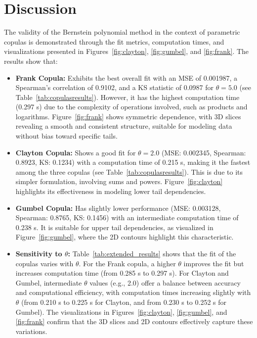 \documentclass[
	11pt, %
	fleqn, %
	a4paper, %
]{LegrandOrangeBook}
\begin{document}
\section{Discussion}
The validity of the Bernstein polynomial method in the context of parametric copulas is demonstrated through the fit metrics, computation times, and visualizations presented in Figures~\ref{fig:clayton}, \ref{fig:gumbel}, and \ref{fig:frank}. The results show that:

\begin{itemize}
\item \textbf{Frank Copula:} Exhibits the best overall fit with an MSE of 0.001987, a Spearman's correlation of 0.9102, and a KS statistic of 0.0987 for $\theta=5.0$ (see Table~\ref{tab:copulasresults}). However, it has the highest computation time (0.297 s) due to the complexity of operations involved, such as products and logarithms. Figure~\ref{fig:frank} shows symmetric dependence, with 3D slices revealing a smooth and consistent structure, suitable for modeling data without bias toward specific tails.

\item \textbf{Clayton Copula:} Shows a good fit for $\theta=2.0$ (MSE: 0.002345, Spearman: 0.8923, KS: 0.1234) with a computation time of 0.215 s, making it the fastest among the three copulas (see Table~\ref{tab:copulasresults}). This is due to its simpler formulation, involving sums and powers. Figure~\ref{fig:clayton} highlights its effectiveness in modeling lower tail dependencies.

\item \textbf{Gumbel Copula:} Has slightly lower performance (MSE: 0.003128, Spearman: 0.8765, KS: 0.1456) with an intermediate computation time of 0.238 s. It is suitable for upper tail dependencies, as visualized in Figure~\ref{fig:gumbel}, where the 2D contours highlight this characteristic.

\item \textbf{Sensitivity to $\theta$:} Table~\ref{tab:extended_results} shows that the fit of the copulas varies with $\theta$. For the Frank copula, a higher $\theta$ improves the fit but increases computation time (from 0.285 s to 0.297 s). For Clayton and Gumbel, intermediate $\theta$ values (e.g., 2.0) offer a balance between accuracy and computational efficiency, with computation times increasing slightly with $\theta$ (from 0.210 s to 0.225 s for Clayton, and from 0.230 s to 0.252 s for Gumbel). The visualizations in Figures~\ref{fig:clayton}, \ref{fig:gumbel}, and \ref{fig:frank} confirm that the 3D slices and 2D contours effectively capture these variations.
\end{itemize}
\end{document}
